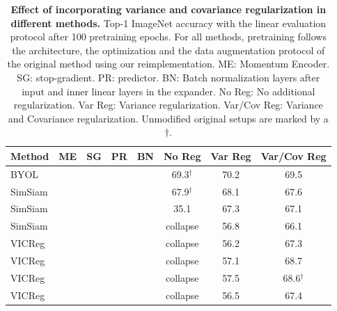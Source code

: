 \documentclass{article} %
\newcommand{\algo}{VICReg}
\newcommand{\expandernospace}{expander}
\newcommand{\cmark}{\ding{51}}%
\begin{document}
\begin{table}[t]
\caption{\textbf{Effect of incorporating variance and covariance regularization in different methods.} Top-1 ImageNet accuracy with the linear evaluation protocol after 100 pretraining epochs. For all methods, pretraining follows the architecture, the optimization and the data augmentation protocol of the original method using our reimplementation. ME: Momentum Encoder. SG: stop-gradient. PR: predictor. BN: Batch normalization layers after input and inner linear layers in the \expandernospace. No Reg: No additional regularization. Var Reg: Variance regularization. Var/Cov Reg: Variance and Covariance regularization. Unmodified original setups are marked by a ${\dagger}$.}
\label{tab:ablation}
\vspace{-1.5em}
\setlength{\tabcolsep}{10.5pt}
\vskip 0.15in
\begin{center}
\begin{tabular}{lcccc|ccc}
\toprule
Method & ME & SG & PR & BN & No Reg & Var Reg & Var/Cov Reg \\
\midrule
BYOL            & \cmark & \cmark & \cmark & \cmark & \hspace{0.14em} 69.3$^{\dagger}$ & 70.2 & 69.5 \\
SimSiam         &        & \cmark & \cmark & \cmark & \hspace{0.14em} 67.9$^{\dagger}$ & 68.1 & 67.6 \\
SimSiam         &        & \cmark & \cmark &        & 35.1      & 67.3 & 67.1 \\
SimSiam         &        & \cmark &        &        & collapse  & 56.8 & 66.1 \\
\algo           &        &        & \cmark &        & collapse  & 56.2 & 67.3 \\
\algo           &        &        & \cmark & \cmark & collapse  & 57.1 & 68.7 \\
\algo           &        &        &        & \cmark & collapse  & 57.5 & \hspace{0.14em} 68.6$^{\dagger}$ \\
\algo           &        &        &        &        & collapse  & 56.5 & 67.4 \\
\bottomrule
\end{tabular}
\end{center}
\vspace{-2mm}
\end{table}
\end{document}
